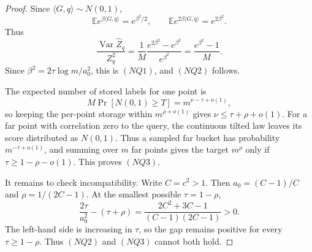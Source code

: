 \documentclass[10pt]{article}
\theoremstyle{definition}
\newcommand{\E}{\mathbb{E}}
\newcommand{\ip}[2]{\langle #1,#2\rangle}
\begin{document}
\begin{proof}
   Since \(\ip{G}{q}\sim N(0,1)\),
   \[
      \E e^{\beta\ip{G}{q}}=e^{\beta^2/2},
      \qquad
      \E e^{2\beta\ip{G}{q}}=e^{2\beta^2}.
   \]
   Thus
   \[
      \frac{\operatorname{Var}\widehat Z_q}{Z_q^2}
      =
      \frac1M
      \frac{e^{2\beta^2}-e^{\beta^2}}{e^{\beta^2}}
      =
      \frac{e^{\beta^2}-1}{M}.
   \]
   Since \(\beta^2=2\tau\log m/a_0^2\), this is \((NQ1)\), and \((NQ2)\)
   follows.

   The expected number of stored labels for one point is
   \[
      M\Pr[N(0,1)\ge T]=m^{\nu-\tau+o(1)},
   \]
   so keeping the per-point storage within \(m^{\rho+o(1)}\) gives
   \(\nu\le\tau+\rho+o(1)\).  For a far point with correlation zero to the
   query, the continuous tilted law leaves its score distributed as \(N(0,1)\).
   Thus a sampled far bucket has probability \(m^{-\tau+o(1)}\), and summing
   over \(m\) far points gives the target \(m^\rho\) only if
   \(\tau\ge1-\rho-o(1)\).  This proves \((NQ3)\).

   It remains to check incompatibility.  Write \(C=c^2>1\).  Then
   \(a_0=(C-1)/C\) and \(\rho=1/(2C-1)\).  At the smallest possible
   \(\tau=1-\rho\),
   \[
      \frac{2\tau}{a_0^2}-(\tau+\rho)
      =
      \frac{2C^2+3C-1}{(C-1)(2C-1)}
      >0.
   \]
   The left-hand side is increasing in \(\tau\), so the gap remains positive
   for every \(\tau\ge1-\rho\).  Thus \((NQ2)\) and \((NQ3)\) cannot both hold.
\end{proof}
\end{document}
